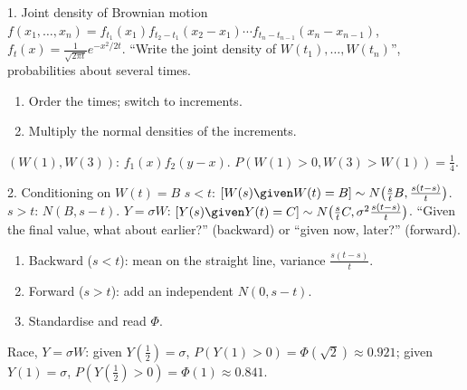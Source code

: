 \begin{card}{1. Joint density of Brownian motion}
\Formula
$f(x_1,\dots,x_n)=f_{t_1}(x_1)f_{t_2-t_1}(x_2-x_1)\cdots f_{t_n-t_{n-1}}(x_n-x_{n-1})$, \;$f_t(x)=\frac{1}{\sqrt{2\pi t}}e^{-x^2/2t}$.
\UseWhen
``Write the joint density of $W(t_1),\dots,W(t_n)$'', probabilities about several times.
\HowTo
\begin{enumerate}
  \item Order the times; switch to increments.
  \item Multiply the normal densities of the increments.
\end{enumerate}
\Caveats
{}
\begin{cardex}
$(W(1),W(3))$: $f_1(x)f_2(y-x)$. $P(W(1)>0,W(3)>W(1))=\frac14$.
\end{cardex}
\end{card}

\begin{card}{2. Conditioning on \texorpdfstring{$W(t)=B$}{W(t)=B}}
\Formula
$s<t$: $[W(s)\given W(t)=B]\sim N\big(\frac stB,\frac{s(t-s)}{t}\big)$. \;$s>t$: $N(B,s-t)$. \;$Y=\sigma W$: $[Y(s)\given Y(t)=C]\sim N\big(\frac stC,\sigma^2\frac{s(t-s)}t\big)$.
\UseWhen
``Given the final value, what about earlier?'' (backward) or ``given now, later?'' (forward).
\HowTo
\begin{enumerate}
  \item Backward ($s<t$): mean on the straight line, variance $\frac{s(t-s)}t$.
  \item Forward ($s>t$): add an independent $N(0,s-t)$.
  \item Standardise and read $\Phi$.
\end{enumerate}
\Caveats
{}
\begin{cardex}
Race, $Y=\sigma W$: given $Y(\frac12)=\sigma$, $P(Y(1)>0)=\Phi(\sqrt2)\approx0.921$; given $Y(1)=\sigma$, $P(Y(\frac12)>0)=\Phi(1)\approx0.841$.
\end{cardex}
\end{card}
